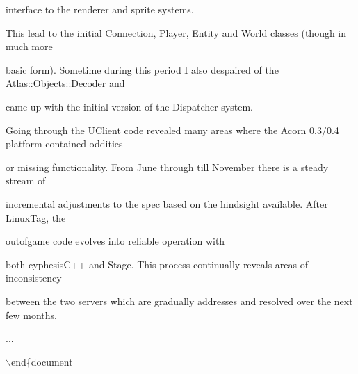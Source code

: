 \documentclass[12pt]{article}
\begin{document}
interface to the renderer and sprite systems.



This lead to the initial Connection, Player, Entity and World classes (though in much more

basic form). Sometime during this period I also despaired of the Atlas::Objects::Decoder and

came up with the initial version of the Dispatcher system.



Going through the UClient code revealed many areas where the Acorn 0.3/0.4 platform contained oddities

or missing functionality. From June through till November there is a steady stream of

incremental adjustments to the spec based on the hindsight available. After LinuxTag, the

outofgame code evolves into reliable operation with

both cyphesisC++ and Stage. This process continually reveals areas of inconsistency

between the two servers which are gradually addresses and resolved over the next few months.



...



\ensuremath{\backslash}end\{document
\end{document}
